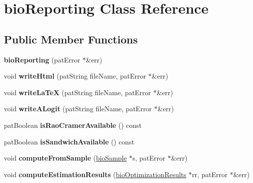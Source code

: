 \hypertarget{classbio_reporting}{}\section{bio\+Reporting Class Reference}
\label{classbio_reporting}
\subsection*{Public Member Functions}
\begin{DoxyCompactItemize}
\item 
\mbox{\label{classbio_reporting_a537359f9cf2ed4e4b474b33bf2d28178}} 
{\bfseries bio\+Reporting} (pat\+Error $\ast$\&err)
\item 
\mbox{\label{classbio_reporting_aca6263feeaf1f25d0084bb537471bddd}} 
void {\bfseries write\+Html} (pat\+String file\+Name, pat\+Error $\ast$\&err)
\item 
\mbox{\label{classbio_reporting_aeb4f76a9ddfa9b32ed0e90e45e10dfb0}} 
void {\bfseries write\+La\+TeX} (pat\+String file\+Name, pat\+Error $\ast$\&err)
\item 
\mbox{\label{classbio_reporting_a17b9df80f83e3801db831f2957a55927}} 
void {\bfseries write\+A\+Logit} (pat\+String file\+Name, pat\+Error $\ast$\&err)
\item 
\mbox{\label{classbio_reporting_abfd2df44ff8b7f250603400690ef918c}} 
pat\+Boolean {\bfseries is\+Rao\+Cramer\+Available} () const
\item 
\mbox{\label{classbio_reporting_a066980b6a86be55d7eab584f77d0f702}} 
pat\+Boolean {\bfseries is\+Sandwich\+Available} () const
\item 
\mbox{\label{classbio_reporting_aba8e07f519890046682238e54ce7b4a7}} 
void {\bfseries compute\+From\+Sample} (\hyperlink{classbio_sample}{bio\+Sample} $\ast$s, pat\+Error $\ast$\&err)
\item 
\mbox{\label{classbio_reporting_a02959ec829d7923e6261e1d91b80b567}} 
void {\bfseries compute\+Estimation\+Results} (\hyperlink{classbio_optimization_results}{bio\+Optimization\+Results} $\ast$rr, pat\+Error $\ast$\&err)

\end{DoxyCompactItemize}
